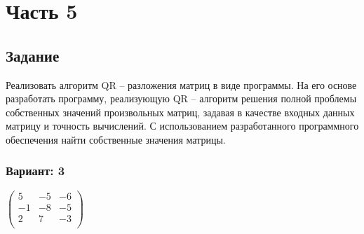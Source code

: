 \chapter*{Часть 5}

\section*{Задание}
Реализовать алгоритм QR – разложения матриц в виде программы. На его основе разработать
программу, реализующую QR – алгоритм решения полной проблемы собственных значений
произвольных матриц, задавая в качестве входных данных матрицу и точность вычислений. С
использованием разработанного программного обеспечения найти собственные значения
матрицы.

\subsection*{Вариант: 3}


$\begin{pmatrix}
    5 & -5 & -6 \\
    -1 & -8 & -5 \\
    2 & 7 & -3 \\
\end{pmatrix}$

\pagebreak